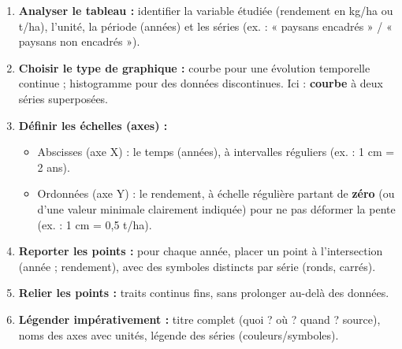 \documentclass[11pt]{article}
\begin{document}
\begin{methode}
\begin{enumerate}
    \item \textbf{Analyser le tableau :} identifier la variable étudiée (rendement en kg/ha ou t/ha), l'unité, la période (années) et les séries (ex. : « paysans encadrés » / « paysans non encadrés »).
    \item \textbf{Choisir le type de graphique :} courbe pour une évolution temporelle continue ; histogramme pour des données discontinues. Ici : \textbf{courbe} à deux séries superposées.
    \item \textbf{Définir les échelles (axes) :}
    \begin{itemize}
        \item Abscisses (axe X) : le temps (années), à intervalles réguliers (ex. : 1 cm = 2 ans).
        \item Ordonnées (axe Y) : le rendement, à échelle régulière partant de \textbf{zéro} (ou d'une valeur minimale clairement indiquée) pour ne pas déformer la pente (ex. : 1 cm = 0,5 t/ha).
    \end{itemize}
    \item \textbf{Reporter les points :} pour chaque année, placer un point à l'intersection (année ; rendement), avec des symboles distincts par série (ronds, carrés).
    \item \textbf{Relier les points :} traits continus fins, sans prolonger au-delà des données.
    \item \textbf{Légender impérativement :} titre complet (quoi ? où ? quand ? source), noms des axes avec unités, légende des séries (couleurs/symboles).
\end{enumerate}
\end{methode}
\end{document}
